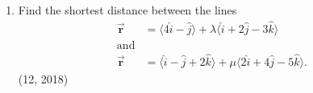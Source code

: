 \begin{enumerate}[label=\thesubsection.\arabic*,ref=\thesubsection.\theenumi]
\item Find the shortest distance between the lines 
\begin{align*}
\overrightarrow{\mathbf{r}} &= \langle 4\hat{i} - \hat{j} \rangle + \lambda \langle \hat{i} + 2\hat{j} - 3\hat{k} \rangle \\
\text{and} \\
\overrightarrow{\mathbf{r}} &= \langle \hat{i} - \hat{j} + 2\hat{k} \rangle + \mu \langle 2\hat{i} + 4\hat{j} - 5\hat{k} \rangle.
\end{align*}
\hfill (12, 2018)
\end{enumerate}

